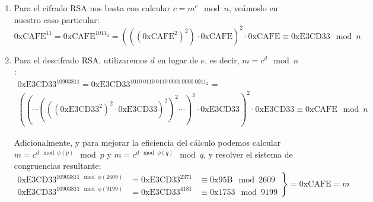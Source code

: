 	\begin{enumerate}
		\item Para el cifrado RSA nos basta con calcular $c = m^e \mod n$, veámoslo en nuestro caso particular:
		$$\mathrm{0xCAFE}^{11} = \mathrm{0xCAFE}^{1011_2} = \left(\left(\left(\mathrm{0xCAFE}^2\right)^2\right)
		\cdot \mathrm{0xCAFE}\right)^2 \cdot \mathrm{0xCAFE} \equiv \mathrm{0xE3CD33} \mod n$$
		
		\item Para el descifrado RSA, utilizaremos $d$ en lugar de $e$, es decir, $m = c^d \mod n$: \\
		\begin{gather*}
			\mathrm{0xE3CD33}^{10903811} = \mathrm{0xE3CD33}^{1010\ 0110\ 0110\ 0001\ 0000\ 0011_2} = \\
			\left(\left( \cdots \left(\left(\left(\mathrm{0xE3CD33}^2\right)^2 \cdot \mathrm{0xE3CD33}
			\right)^2\right)^2 \cdots \right)^2 \cdot \mathrm{0xE3CD33}\right)^2 \cdot \mathrm{0xE3CD33}
			\equiv \mathrm{0xCAFE} \mod n
		\end{gather*}
		
		Adicionalmente, y para mejorar la eficiencia del cálculo podemos calcular $m = c^{d \mod \phi(p)} \mod p$
		y $m = c^{d \mod \phi(q)} \mod q$, y resolver el sistema de congruencias resultante:
		$$\left.\begin{aligned}
		        \mathrm{0xE3CD33}^{10903811 \mod \phi(2609)} &= \mathrm{0xE3CD33}^{2371} &\equiv \mathrm{0x95B} \mod 2609\\
		        \mathrm{0xE3CD33}^{10903811 \mod \phi(9199)} &= \mathrm{0xE3CD33}^{4181} &\equiv \mathrm{0x1753} \mod 9199
		       \end{aligned}
		\right\} = \mathrm{0xCAFE} = m$$
	\end{enumerate}
